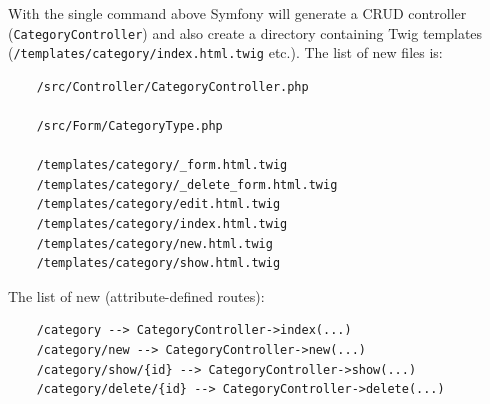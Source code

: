 \documentclass[a4paperpaper,openright]{book}
\newenvironment{Shaded}{}{}
\newcommand{\ExtensionTok}[1]{#1}
\newcommand{\NormalTok}[1]{#1}
\newcommand{\OperatorTok}[1]{\textcolor[rgb]{0.40,0.40,0.40}{#1}}
\begin{document}
\begin{Shaded}
\end{Shaded}

With the single command above Symfony will generate a CRUD controller
(\texttt{CategoryController}) and also create a directory containing
Twig templates (\texttt{/templates/category/index.html.twig} etc.). The
list of new files is:

\begin{verbatim}
    /src/Controller/CategoryController.php

    /src/Form/CategoryType.php

    /templates/category/_form.html.twig
    /templates/category/_delete_form.html.twig
    /templates/category/edit.html.twig
    /templates/category/index.html.twig
    /templates/category/new.html.twig
    /templates/category/show.html.twig
\end{verbatim}

The list of new (attribute-defined routes):

\begin{verbatim}
    /category --> CategoryController->index(...)
    /category/new --> CategoryController->new(...)
    /category/show/{id} --> CategoryController->show(...)
    /category/delete/{id} --> CategoryController->delete(...)
\end{verbatim}
\end{document}
